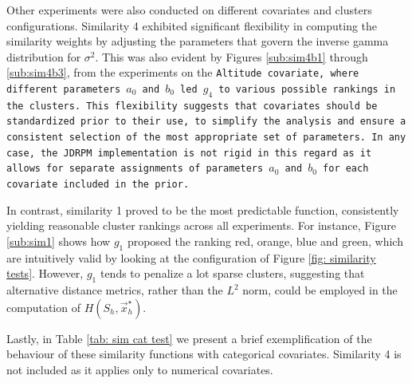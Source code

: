 \documentclass[12pt,	%
	a4paper,		%
	twoside,		%
	openright,		%
	titlepage,%
	]{book}
\theoremstyle{definition}
\begin{document}
Other experiments were also conducted on different covariates and clusters configurations. Similarity 4 exhibited significant flexibility in computing the similarity weights by adjusting the parameters that govern the inverse gamma distribution for $\sigma^2$. This was also evident by Figures \ref{sub:sim4b1} through \ref{sub:sim4b3}, from the experiments on the \tt{Altitude} covariate, where different parameters $a_0$ and $b_0$ led $g_4$ to various possible rankings in the clusters. This flexibility suggests that covariates should be standardized prior to their use, to simplify the analysis and ensure a consistent selection of the most appropriate set of parameters. In any case, the JDRPM implementation is not rigid in this regard as it allows for separate assignments of parameters $a_0$ and $b_0$ for each covariate included in the prior. 

In contrast, similarity 1 proved to be the most predictable function, consistently yielding reasonable cluster rankings across all experiments. For instance, Figure \ref{sub:sim1} shows how $g_1$ proposed the ranking red, orange, blue and green, which are intuitively valid by looking at the configuration of Figure \ref{fig: similarity tests}. However, $g_1$ tends to penalize a lot sparse clusters, suggesting that alternative distance metrics, rather than the $L^2$ norm, could be employed in the computation of $H(S_h,\vec{x}_h^\star)$.

Lastly, in Table \ref{tab: sim cat test} we present a brief exemplification of the behaviour of these similarity functions with categorical covariates. Similarity 4 is not included as it applies only to numerical covariates. 
\end{document}
